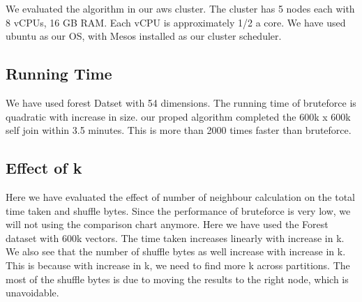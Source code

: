 \documentclass[conference]{IEEEtran}
\begin{document}
We evaluated the algorithm in our aws cluster. The cluster has 5 nodes
each with 8 vCPUs, 16 GB RAM. Each vCPU is approximately 1/2 a
core. We have used ubuntu as our OS, with Mesos installed as our
cluster scheduler.

\subsection{Running Time}

We have used forest Datset with 54 dimensions. The running time of
bruteforce is quadratic with increase in size.
our proped algorithm completed the 600k x 600k self join within 3.5
minutes. This is more than 2000 times faster than bruteforce.

\bigskip


\subsection{Effect of k}

Here we have evaluated the effect of number of neighbour calculation
on the total time taken and shuffle bytes. Since the performance of bruteforce is very low, we will not using the
comparison chart anymore. Here we have used the Forest dataset with
600k vectors. The time taken increases linearly with increase in k. We
also see that the number of shuffle bytes as well increase with
increase in k. This is because with increase in k, we need to find
more k across partitions. The most of the shuffle bytes is due to
moving the results to the right node, which is unavoidable.

\medskip
\end{document}
